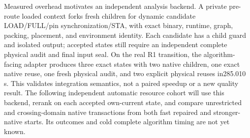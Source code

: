 Measured overhead motivates an independent analysis backend. A private pre-route loaded context forks fresh children for dynamic candidate LOAD/FULL/pin synchronization/STA, with exact binary, runtime, graph, packing, placement, and environment identity. Each candidate has a child guard and isolated output; accepted states still require an independent complete physical audit and final input seal. On the real R1 transition, the algorithm-facing adapter produces three exact states with two native children, one exact native reuse, one fresh physical audit, and two explicit physical reuses in285.010 s. This validates integration semantics, not a paired speedup or a new quality result. The following independent automatic resource cohort will use this backend, rerank on each accepted own-current state, and compare unrestricted and crossing-domain native transactions from both fast repaired and stronger-native starts. Its outcomes and cold complete algorithm timing are not yet known.
